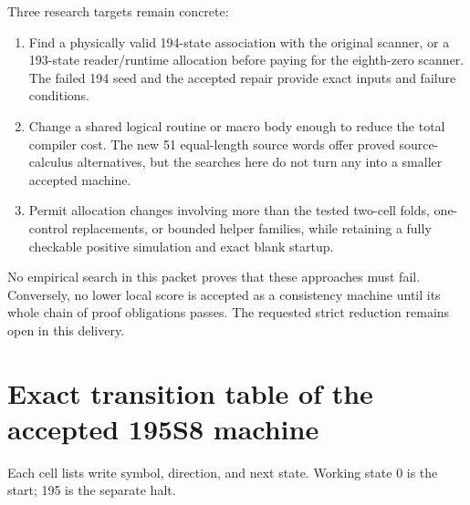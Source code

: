 \documentclass[11pt,letterpaper]{article}
\begin{document}
Three research targets remain concrete:
\begin{enumerate}
\item Find a physically valid 194-state association with the original
scanner, or a 193-state reader/runtime allocation before paying for
the eighth-zero scanner. The failed 194 seed and the accepted repair
provide exact inputs and failure conditions.
\item Change a shared logical routine or macro body enough to reduce
the total compiler cost. The new 51 equal-length source words offer
proved source-calculus alternatives, but the searches here do not
turn any into a smaller accepted machine.
\item Permit allocation changes involving more than the tested
two-cell folds, one-control replacements, or bounded helper families,
while retaining a fully checkable positive simulation and exact
blank startup.
\end{enumerate}
No empirical search in this packet proves that these approaches must
fail. Conversely, no lower local score is accepted as a consistency
machine until its whole chain of proof obligations passes.
The requested strict reduction remains open in this delivery.

\clearpage
\appendix
\section{Exact transition table of the accepted 195S8 machine}
\label{app:table}
Each cell lists write symbol, direction, and next state. Working state
0 is the start; 195 is the separate halt.


\clearpage


\clearpage





\end{document}
